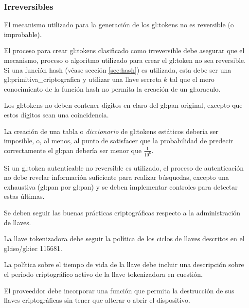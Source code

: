 %
%

\subsubsection{Irreversibles}

{
  El mecanismo utilizado para la generación de los \glspl{gl:token}
  no es reversible (o improbable).

  {
    El proceso para crear \glspl{gl:token} clasificado como irreversible
    debe asegurar que el mecanismo, proceso o algoritmo utilizado para 
    crear el \gls{gl:token} no sea reversible. Si una función hash (véase
    sección \ref{sec:hash}) es utilizada, esta debe ser una 
    \gls{gl:primitiva_criptografica} y utilizar una llave secreta $k$ tal que
    el mero conocimiento de la función hash no permita la creación de un
    \gls{gl:oraculo}.
  }

  {
    Los \glspl{gl:token} no deben contener dígitos en claro del \gls{gl:pan}
    original, excepto que estos dígitos sean una coincidencia.
  }

  {
    La creación de una tabla o \textit{diccionario} de \glspl{gl:token}
    estáticos debería ser imposible, o, al menos, al punto de satisfacer
    que la probabilidad de predecir correctamente el \gls{gl:pan} debería ser 
    menor que $\frac{1}{10^6}$.
  }

  {
    Si un \gls{gl:token} autenticable no reversible es utilizado, el
    proceso de autenticación no debe revelar información suficiente para
    realizar búsquedas, excepto una exhaustiva (\gls{gl:pan} por 
    \gls{gl:pan}) y se deben implementar controles para detectar estas
    últimas.
  }
}

{
  Se deben seguir las buenas prácticas criptográficas respecto a la
  administración de llaves.
  
  {
    La llave tokenizadora debe seguir la política de los ciclos de llaves
    descritos en el \acrshort{gl:iso}/\acrshort{gl:iec} 115681.
  }

  {
    La política sobre el tiempo de vida de la llave debe incluir una 
    descripción sobre el periodo criptográfico activo de la llave 
    tokenizadora en cuestión.
  }

  {
   	El proveeddor debe incorporar una función que permita la destrucción
   	de sus llaves criptográficas sin tener que alterar o abrir el
   	dispositivo.  
  }
}

